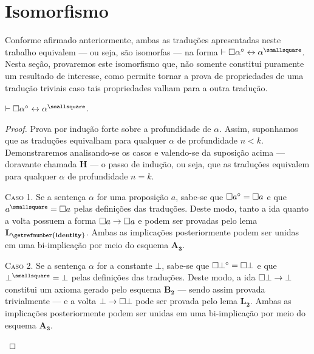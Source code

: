 \section{Isomorfismo}

Conforme afirmado anteriormente, ambas as traduções apresentadas neste trabalho equivalem --- ou seja, são isomorfas --- na forma $\entails\nec\alpha^\circ\leftrightarrow\alpha^\smallsquare$. Nesta seção, provaremos este isomorfismo que, não somente constitui puramente um resultado de interesse, como permite tornar a prova de propriedades de uma tradução triviais caso tais propriedades valham para a outra tradução.

\begin{theorem}
    $\entails\nec\alpha^\circ\leftrightarrow\alpha^\smallsquare$.

    \begin{proof}
        Prova por indução forte sobre a profundidade de $\alpha$.
        Assim, suponhamos que as traduções equivalham para qualquer $\alpha$ de profundidade $n<k$.
        Demonstraremos analisando-se os casos e valendo-se da suposição acima --- doravante chamada $\mathbf{H}$ --- o passo de indução, ou seja, que as traduções equivalem para qualquer $\alpha$ de profundidade $n=k$.

        \begin{case}
            \textsc{Caso 1.}
            Se a sentença $\alpha$ for uma proposição $a$, sabe-se que $\mathord{\square} a^\circ=\mathord{\square} a$ e que $a^\smallsquare=\nec a$ pelas definições das traduções.
            Deste modo, tanto a ida quanto a volta possuem a forma $\mathord{\square} a\to\mathord{\square} a$ e podem ser provadas pelo lema \hyperref[identity]{$\mathbf{L_\getrefnumber{identity}}$}.
            Ambas as implicações posteriormente podem ser unidas em uma bi-implicação por meio do esquema \hyperref[MA3]{$\mathbf{A_3}$}.
        \end{case}

        \begin{case}
            \textsc{Caso 2.}
            Se a sentença $\alpha$ for a constante $\bot$, sabe-se que $\mathord{\square}\bot^\circ=\mathord{\square}\bot$ e que $\bot^\smallsquare=\bot$ pelas definições das traduções.
            Deste modo, a ida $\mathord{\square}\bot\to\bot$ constitui um axioma gerado pelo esquema \hyperref[MB2]{$\mathbf{B_2}$} --- sendo assim provada trivialmente --- e a volta $\bot\to\mathord{\square}\bot$ pode ser provada pelo lema \hyperref[explosion]{$\mathbf{L_2}$}.
            Ambas as implicações posteriormente podem ser unidas em uma bi-implicação por meio do esquema \hyperref[MA3]{$\mathbf{A_3}$}.
        \end{case}


\end{proof}
\end{theorem}
